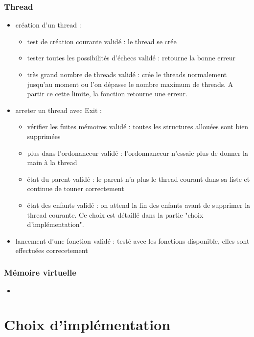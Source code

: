 \documentclass{article}
\begin{document}
		\subsubsection{Thread}
			\begin{itemize}
				\item création d'un thread :
					\begin{itemize}
						\item test de création courante 				validé : le thread se crée
						\item tester toutes les possibilités d'échecs	validé : retourne la bonne erreur
						\item très grand nombre de threads 				validé : crée le threads normalement jusqu'au moment ou l'on dépasse le nombre maximum de threads. A partir ce cette limite, la fonction retourne une erreur.
					\end{itemize}
				\item arreter un thread avec Exit :
					\begin{itemize}
						\item vérifier les fuites mémoires		validé : toutes les structures allouées sont bien supprimées
						\item plus dans l'ordonanceur			validé : l'ordonnanceur n'essaie plus de donner la main à la thread
						\item état du parent					validé : le parent n'a plus le thread courant dans sa liste et continue de touner correctement
						\item état des enfants					validé : on attend la fin des enfants avant de supprimer la thread courante. Ce choix est détaillé dans la partie "choix d'implémentation".
					\end{itemize}
				\item lancement d'une fonction		validé : testé avec les fonctions disponible, elles sont effectuées correcetement
			\end{itemize}

		\subsubsection{Mémoire virtuelle}
			\begin{itemize}
				\item 
			\end{itemize}

\section{Choix d'implémentation}
\end{document}
